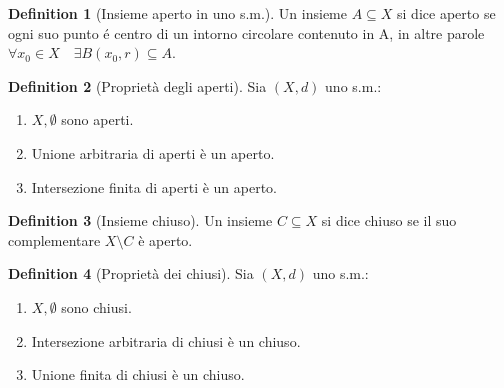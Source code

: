 \documentclass[leqno]{article}
\theoremstyle{definition}
\newtheorem{definition}{Definition}[section]
\numberwithin{equation}{section}
\theoremstyle{remark}
\begin{document}
	
	\begin{definition}[Insieme aperto in uno s.m.]
		Un insieme $A\subseteq X$ si dice aperto se ogni suo punto é centro di un intorno circolare contenuto in A, in altre parole $\forall x_0 \in X \quad \exists B(x_0,r)\subseteq A$. 
	\end{definition}
	
	\begin{definition}[Proprietà degli aperti]
		Sia $(X,d)$ uno s.m.:
		\begin{enumerate}
			\item $X,\emptyset$ sono aperti.
			\item Unione arbitraria di aperti è un aperto.
			\item Intersezione finita di aperti è un aperto.
		\end{enumerate}
		
	\end{definition}
	\begin{definition}[Insieme chiuso]
		Un insieme $C \subseteq X$ si dice chiuso se il suo complementare $X \setminus C$ è aperto.
	\end{definition}
	
	\begin{definition}[Proprietà dei chiusi]
		Sia $(X,d)$ uno s.m.:
		\begin{enumerate}
			\item $X,\emptyset$ sono chiusi.
			\item Intersezione arbitraria di chiusi è un chiuso.
			\item Unione finita di chiusi è un chiuso.
		\end{enumerate}
	\end{definition}
	
\end{document}
